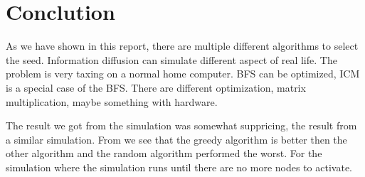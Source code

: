 \chapter{Conclution}
As we have shown in this report, there are multiple different algorithms to select the seed. Information diffusion can simulate different aspect of real life. The problem is very taxing on a normal home computer. BFS can be optimized, ICM is a special case of the BFS. There are different optimization, matrix multiplication, maybe something with hardware. 

The result we got from the simulation was somewhat suppricing, the result from a similar simulation\cite{MaximizedSpread2003}. From \cite{MaximizedSpread2003} we see that the greedy algorithm is better then the other algorithm and the random algorithm performed the worst. For the simulation where the simulation runs until there are no more nodes to activate.